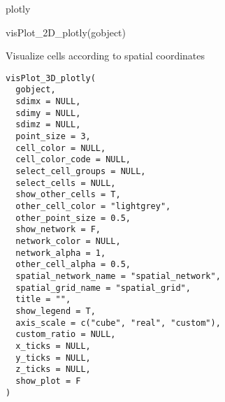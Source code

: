 \documentclass[a4paper]{book}
\begin{document}
%
\begin{Value}
plotly
\end{Value}
%
\begin{Examples}
\begin{ExampleCode}
    visPlot_2D_plotly(gobject)
\end{ExampleCode}
\end{Examples}
%
\begin{Description}\relax
Visualize cells according to spatial coordinates
\end{Description}
%
\begin{Usage}
\begin{verbatim}
visPlot_3D_plotly(
  gobject,
  sdimx = NULL,
  sdimy = NULL,
  sdimz = NULL,
  point_size = 3,
  cell_color = NULL,
  cell_color_code = NULL,
  select_cell_groups = NULL,
  select_cells = NULL,
  show_other_cells = T,
  other_cell_color = "lightgrey",
  other_point_size = 0.5,
  show_network = F,
  network_color = NULL,
  network_alpha = 1,
  other_cell_alpha = 0.5,
  spatial_network_name = "spatial_network",
  spatial_grid_name = "spatial_grid",
  title = "",
  show_legend = T,
  axis_scale = c("cube", "real", "custom"),
  custom_ratio = NULL,
  x_ticks = NULL,
  y_ticks = NULL,
  z_ticks = NULL,
  show_plot = F
)
\end{verbatim}
\end{Usage}
%
\end{document}
